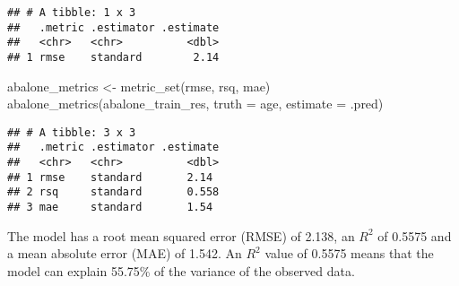 \documentclass[
]{article}
\newenvironment{Shaded}{\begin{snugshade}}{\end{snugshade}}
\newcommand{\AttributeTok}[1]{\textcolor[rgb]{0.77,0.63,0.00}{#1}}
\newcommand{\FunctionTok}[1]{\textcolor[rgb]{0.00,0.00,0.00}{#1}}
\newcommand{\NormalTok}[1]{#1}
\newcommand{\OtherTok}[1]{\textcolor[rgb]{0.56,0.35,0.01}{#1}}
\begin{document}
\begin{verbatim}
## # A tibble: 1 x 3
##   .metric .estimator .estimate
##   <chr>   <chr>          <dbl>
## 1 rmse    standard        2.14
\end{verbatim}

\begin{Shaded}
\begin{Highlighting}[]
\NormalTok{abalone\_metrics }\OtherTok{\textless{}{-}} \FunctionTok{metric\_set}\NormalTok{(rmse, rsq, mae)}
\FunctionTok{abalone\_metrics}\NormalTok{(abalone\_train\_res, }\AttributeTok{truth =}\NormalTok{ age, }\AttributeTok{estimate =}\NormalTok{ .pred)}
\end{Highlighting}
\end{Shaded}

\begin{verbatim}
## # A tibble: 3 x 3
##   .metric .estimator .estimate
##   <chr>   <chr>          <dbl>
## 1 rmse    standard       2.14 
## 2 rsq     standard       0.558
## 3 mae     standard       1.54
\end{verbatim}

\n

The model has a root mean squared error (RMSE) of 2.138, an \(R^2\) of
0.5575 and a mean absolute error (MAE) of 1.542. An \(R^2\) value of
0.5575 means that the model can explain 55.75\% of the variance of the
observed data.
\end{document}
